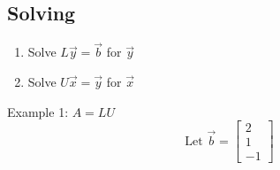 \documentclass[10pt]{article}
\begin{document}
\begin{multicols}{2}
\begin{minipage}{0.95\columnwidth}
        \subsection*{Solving}
        \begin{enumerate}
            \item Solve \(L\overrightarrow{y} = \overrightarrow{b}\) for \(\overrightarrow{y}\)
            \item Solve \(U\overrightarrow{x} = \overrightarrow{y}\) for \(\overrightarrow{x}\)
        \end{enumerate}
        \vspace{1em}
        Example 1: \(A = LU\)
        \begin{equation*}
            \text{Let } \overrightarrow{b} = \begin{bmatrix}
                2 \\
                1 \\
                -1
            \end{bmatrix}
        \end{equation*}


\end{minipage}
\end{multicols}
\end{document}

